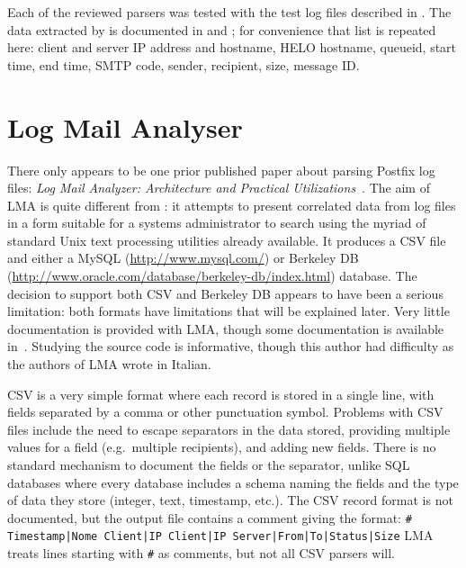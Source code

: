 Each of the reviewed parsers was tested with the \numberOFlogFILES{} test
log files described in .  The data extracted
by \parsername{} is documented in  and
; for convenience that list is repeated here:
client and server \gls{IP} address and hostname, HELO hostname, queueid,
start time, end time, \gls{SMTP} code, sender, recipient, size, message
ID\@.

\section{Log Mail Analyser}

\label{prior art}

There only appears to be one prior published paper about parsing Postfix
log files: \textit{Log Mail Analyzer: Architecture and Practical
Utilizations\/}~\cite{log-mail-analyser}.  The aim of \gls{LMA} is quite
different from \parsername{}: it attempts to present correlated data from
log files in a form suitable for a systems administrator to search using
the myriad of standard Unix text processing utilities already available.
It produces a \gls{CSV} file and either a MySQL
(\url{http://www.mysql.com/}) or Berkeley DB
(\url{http://www.oracle.com/database/berkeley-db/index.html}) database.
The decision to support both \gls{CSV} and Berkeley DB appears to have been
a serious limitation: both formats have limitations that will be explained
later.  Very little documentation is provided with \gls{LMA}, though some
documentation is available in~\cite{log-mail-analyser}.  Studying the
source code is informative, though this author had difficulty as the
authors of \gls{LMA} wrote in Italian.

\gls{CSV} is a very simple format where each record is stored in a single
line, with fields separated by a comma or other punctuation symbol.
Problems with \gls{CSV} files include the need to escape separators in the
data stored, providing multiple values for a field (e.g.\ multiple
recipients), and adding new fields.  There is no standard mechanism to
document the fields or the separator, unlike \gls{SQL} databases where
every database includes a schema naming the fields and the type of data
they store (integer, text, timestamp, etc.).  The \gls{CSV} record format
is not documented, but the output file contains a comment giving the
format:\newline{} \texttt{\# Timestamp|Nome Client|IP Client|IP
Server|From|To|Status|Size} \newline{}\gls{LMA} treats lines starting with
\texttt{\#} as comments, but not all \gls{CSV} parsers will.

